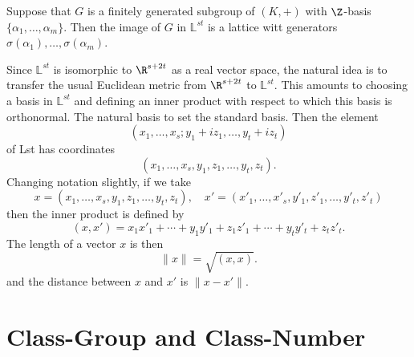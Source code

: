 \begin{corollary}\label{alg int subgroup lattice}
Suppose that $G$ is a finitely generated subgroup of $(K,+)$ with $\Z$-basis $\{\alpha_1,\dots,\alpha_m\}$. Then the image of $G$ in $\mathbb{L}^{st}$ is a lattice witt generators $\sigma(\alpha_1),\dots,\sigma(\alpha_m)$.
\end{corollary}
Since $\mathbb{L}^{st}$ is isomorphic to $\R^{s+2t}$ as a real vector space, the natural idea is to transfer the usual Euclidean metric from $\R^{s+2t}$ to $\mathbb{L}^{st}$. This amounts to choosing a basis in $\mathbb{L}^{st}$ and defining an inner product with respect to which this basis is orthonormal. The natural basis to set the standard basis. Then the element
\[(x_1,\dots,x_s;y_1+iz_1,\dots,y_t+iz_t)\]
of Lst has coordinates
\[(x_1,\dots,x_s,y_1,z_1,\dots,y_t,z_t).\]
Changing notation slightly, if we take
\[x=(x_1,\dots,x_s,y_1,z_1,\dots,y_t,z_t),\quad x'=(x'_1,\dots,x'_s,y'_1,z'_1,\dots,y'_t,z'_t)\]
then the inner product is defined by
\[(x,x')=x_1x'_1+\cdots+y_1y'_1+z_1z'_1+\cdots+y_ty'_t+z_tz'_t.\]
The length of a vector $x$ is then
\[\|x\|=\sqrt{(x,x)}.\]
and the distance between $x$ and $x'$ is $\|x-x'\|$.
\section{Class-Group and Class-Number}
